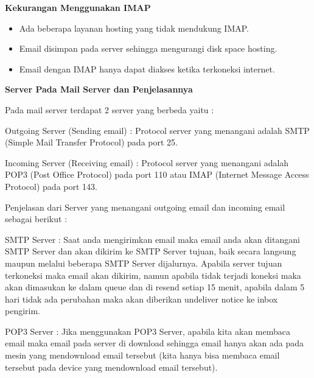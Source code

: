 \documentclass[a4paper,12pt]{report}
\begin{document}
\begin{myEnumerate}
\vspace{12pt}
\textbf{Kekurangan Menggunakan IMAP} \par
\noindent 
\begin{itemize}
\item Ada beberapa layanan hosting yang tidak mendukung IMAP. \par
\noindent 
\item Email disimpan pada server sehingga mengurangi disk space hosting. \par
\noindent 
\item Email dengan IMAP hanya dapat diakses ketika terkoneksi internet.\end{itemize}
 \par
\vspace{12pt}
\noindent 
\textbf{Server Pada Mail Server dan Penjelasannya} \par
\noindent 
Pada mail server terdapat 2 server yang berbeda yaitu : \par
\noindent 
\begin{myEnumerate}
\item Outgoing Server (Sending email) : Protocol server yang menangani adalah SMTP (Simple Mail Transfer Protocol) pada port 25. \par
\noindent 
\item Incoming Server (Receiving email) : Protocol server yang menangani adalah POP3 (Post Office Protocol) pada port 110 atau IMAP (Internet Message Access Protocol) pada port 143.\end{myEnumerate}
 \par
\vspace{12pt}
\noindent 
Penjelasan dari Server yang menangani outgoing email dan incoming email sebagai berikut : \par
\noindent 
\begin{myEnumerate}
\item SMTP Server : Saat anda mengirimkan email maka email anda akan ditangani SMTP Server dan akan dikirim ke SMTP Server tujuan, baik secara langsung maupun melalui beberapa SMTP Server dijalurnya. Apabila server tujuan terkoneksi maka email akan dikirim, namun apabila tidak terjadi koneksi maka akan dimasukan ke dalam queue dan di resend setiap 15 menit, apabila dalam 5 hari tidak ada perubahan maka akan diberikan undeliver notice ke inbox pengirim. \par
\vspace{12pt}
\noindent 
\item POP3 Server : Jika menggunakan POP3 Server, apabila kita akan membaca email maka email pada server di download sehingga email hanya akan ada pada mesin yang mendownload email tersebut (kita hanya bisa membaca email tersebut pada device yang mendownload email tersebut). \par

\end{myEnumerate}
\end{myEnumerate}
\end{document}
